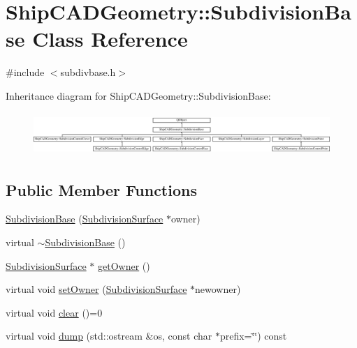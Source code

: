 \hypertarget{classShipCADGeometry_1_1SubdivisionBase}{\section{Ship\-C\-A\-D\-Geometry\-:\-:Subdivision\-Base Class Reference}
\label{classShipCADGeometry_1_1SubdivisionBase}
}


{\ttfamily \#include $<$subdivbase.\-h$>$}

Inheritance diagram for Ship\-C\-A\-D\-Geometry\-:\-:Subdivision\-Base\-:\begin{figure}[H]
\begin{center}
\leavevmode
\includegraphics[height=1.641026cm]{classShipCADGeometry_1_1SubdivisionBase}
\end{center}
\end{figure}
\subsection*{Public Member Functions}
\begin{DoxyCompactItemize}
\item 
\hyperlink{classShipCADGeometry_1_1SubdivisionBase_ad424b99e73d138f565a152ed0ee648cb}{Subdivision\-Base} (\hyperlink{classShipCADGeometry_1_1SubdivisionSurface}{Subdivision\-Surface} $\ast$owner)
\item 
virtual \hyperlink{classShipCADGeometry_1_1SubdivisionBase_a12b4adebcd9fb52d4d82d9ff469e144d}{$\sim$\-Subdivision\-Base} ()
\item 
\hyperlink{classShipCADGeometry_1_1SubdivisionSurface}{Subdivision\-Surface} $\ast$ \hyperlink{classShipCADGeometry_1_1SubdivisionBase_a6003c22ab0149e6f01beff5dde397370}{get\-Owner} ()
\item 
virtual void \hyperlink{classShipCADGeometry_1_1SubdivisionBase_a8e4716f15f6a81c2c5dd26b9931ecb91}{set\-Owner} (\hyperlink{classShipCADGeometry_1_1SubdivisionSurface}{Subdivision\-Surface} $\ast$newowner)
\item 
virtual void \hyperlink{classShipCADGeometry_1_1SubdivisionBase_ae668920d97c0810c72996a531e0ca107}{clear} ()=0
\item 
virtual void \hyperlink{classShipCADGeometry_1_1SubdivisionBase_a7807e64ac8d2acc3da572e03cf0523b6}{dump} (std\-::ostream \&os, const char $\ast$prefix=\char`\"{}\char`\"{}) const 
\end{DoxyCompactItemize}
